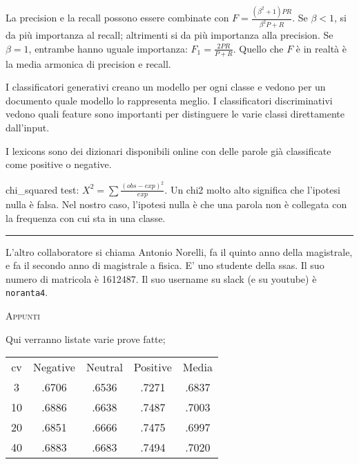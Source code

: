 \documentclass[a4paper,10pt]{article} %
\newcommand{\msection}[1]{%
    {\newpage\bigbreak \bigbreak \par \hfil \huge \textsc {#1}}\par}
\renewcommand{\t}[1]{%
    {\texttt{#1}}}
\begin{document}
La precision e la recall possono essere combinate con $F = \frac{(\beta ^2 + 1)PR}{\beta ^2 P + R}$. Se $\beta < 1$, si da più importanza al recall; altrimenti si da più importanza alla precision. Se $\beta = 1$, entrambe hanno uguale importanza: $F_1 = \frac{2PR}{P + R}$. Quello che $F$ è in realtà è la media armonica di precision e recall.

I classificatori generativi creano un modello per ogni classe e vedono per un documento quale modello lo rappresenta meglio. I classificatori discriminativi vedono quali feature sono importanti per distinguere le varie classi direttamente dall'input.

I lexicons sono dei dizionari disponibili online con delle parole già classificate come positive o negative.

chi\_squared test: $X^2 = \sum \frac{(obs - exp)^2}{exp}$. Un chi2 molto alto significa che l'ipotesi nulla è falsa. Nel nostro caso, l'ipotesi nulla è che una parola non è collegata con la frequenza con cui sta in una classe.

\bigbreak
\hrule
\bigbreak

L'altro collaboratore si chiama Antonio Norelli, fa il quinto anno della magistrale, e fa il secondo anno di magistrale a fisica. E' uno studente della ssas. Il suo numero di matricola è 1612487. Il suo username su slack (e su youtube) è \t{noranta4}.

\msection{Appunti}

Qui verranno listate varie prove fatte;

\begin{tabular} {ccccc}
    cv & Negative & Neutral & Positive & Media \\
    3  & .6706 & .6536 & .7271 & .6837  \\
    10 & .6886 & .6638 & .7487 & .7003  \\
    20 & .6851 & .6666 & .7475 & .6997  \\
    40 & .6883 & .6683 & .7494 & .7020  \\
\end{tabular}
\end{document}
